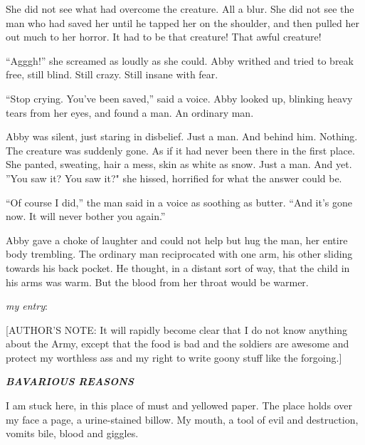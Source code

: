 She did not see what had overcome the creature. All a blur. She did
not see the man who had saved her until he tapped her on the
shoulder, and then pulled her out much to her horror. It had to be
that creature! That awful creature!



``Agggh!'' she screamed as loudly as she could. Abby writhed and
tried to break free, still blind. Still crazy. Still insane with
fear.



``Stop crying. You've been saved,'' said a voice. Abby
looked up, blinking heavy tears from her eyes, and found a man. An
ordinary man.



Abby was silent, just staring in disbelief. Just a man. And behind
him. Nothing. The creature was suddenly gone. As if it had never
been there in the first place. She panted, sweating, hair a mess,
skin as white as snow. Just a man. And yet. ''You saw it? You saw
it?" she hissed, horrified for what the answer could be.



``Of course I did,'' the man said in a voice as soothing
as butter. ``And it's gone now. It will never bother you
again.''



Abby gave a choke of laughter and could not help but hug the man,
her entire body trembling. The ordinary man reciprocated with one
arm, his other sliding towards his back pocket. He thought, in a
distant sort of way, that the child in his arms was warm. But the
blood from her throat would be warmer. 

 





{\em my entry}:



[AUTHOR'S NOTE: It will rapidly become clear that I do not know
anything about the Army, except that the food is bad and the
soldiers are awesome and protect my worthless ass and my right to
write goony stuff like the forgoing.]





{\bf {\em BAVARIOUS REASONS}}







I am stuck here, in this place of must and yellowed paper. The
place holds over my face a page, a urine-stained billow. My mouth,
a tool of evil and destruction, vomits bile, blood and
giggles.




